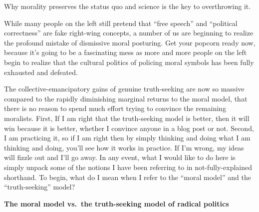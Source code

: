 \documentclass[a4paper,12pt,margin=.5in]{article}
\begin{document}
Why morality preserves the status quo and science is the key to
overthrowing it.

While many people on the left still pretend that ``free speech'' and
``political correctness'' are fake right-wing concepts, a number of us
are beginning to realize the profound mistake of dismissive moral
posturing. Get your popcorn ready now, because it's going to be a
fascinating mess as more and more people on the left begin to realize
that the cultural politics of policing moral symbols has been fully
exhausted and defeated.

The collective-emancipatory gains of genuine truth-seeking are now so
massive compared to the rapidly diminishing marginal returns to the
moral model, that there is no reason to spend much effort trying to
convince the remaining moralists. First, If I am right that the
truth-seeking model is better, then it will win because it is better,
whether I convince anyone in a blog post or not. Second, I am practicing
it, so if I am right then by simply thinking and doing what I am
thinking and doing, you'll see how it works in practice. If I'm wrong,
my ideas will fizzle out and I'll go away. In any event, what I would
like to do here is simply unpack some of the notions I have been
referring to in not-fully-explained shorthand. To begin, what do I mean
when I refer to the ``moral model'' and the ``truth-seeking'' model?

\textbf{The moral model vs.~the truth-seeking model of radical politics}
\end{document}
